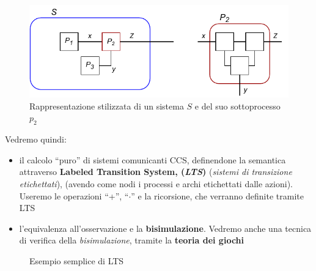 \documentclass[a4paper,12pt, oneside]{book}
\begin{document}
\begin{figure}[H]
  \includegraphics[scale = 0.9]{img/proc.pdf}
  \caption{Rappresentazione stilizzata di un sistema $S$ e del suo sottoprocesso
    $p_2$}
  \label{fig:proc}
\end{figure}
Vedremo quindi:
\begin{itemize}
  \item il calcolo ``puro'' di sistemi comunicanti CCS, definendone la semantica
  attraverso \textbf{Labeled Transition System, (\textit{LTS})} (\textit{sistemi
    di transizione etichettati}), (avendo come nodi i processi e archi
  etichettati dalle azioni). Useremo le operazioni ``+'', ``$\cdot$'' e la
  ricorsione, che verranno definite tramite LTS
  \item l'equivalenza all'osservazione e la \textbf{bisimulazione}. Vedremo
  anche una tecnica di verifica della \textit{bisimulazione}, tramite la
  \textbf{teoria dei giochi}
\end{itemize}
\begin{figure}
  \centering
  \caption{Esempio semplice di LTS}
  \label{fig:l}
\end{figure}
\end{document}
